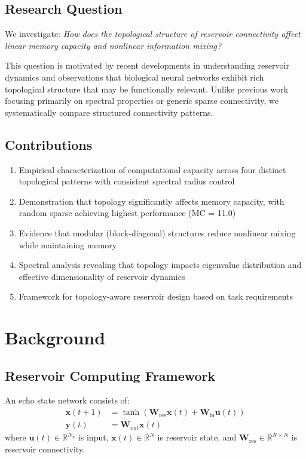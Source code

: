 \documentclass[11pt]{article}
\begin{document}
\subsection{Research Question}

We investigate: \textit{How does the topological structure of reservoir connectivity affect linear memory capacity and nonlinear information mixing?} 

This question is motivated by recent developments in understanding reservoir dynamics \citep{hart2024quantum} and observations that biological neural networks exhibit rich topological structure that may be functionally relevant. Unlike previous work focusing primarily on spectral properties or generic sparse connectivity, we systematically compare structured connectivity patterns.

\subsection{Contributions}

\begin{enumerate}
\item Empirical characterization of computational capacity across four distinct topological patterns with consistent spectral radius control
\item Demonstration that topology significantly affects memory capacity, with random sparse achieving highest performance (MC = 11.0)
\item Evidence that modular (block-diagonal) structures reduce nonlinear mixing while maintaining memory
\item Spectral analysis revealing that topology impacts eigenvalue distribution and effective dimensionality of reservoir dynamics
\item Framework for topology-aware reservoir design based on task requirements
\end{enumerate}

\section{Background}

\subsection{Reservoir Computing Framework}

An echo state network consists of:
\begin{align}
\mathbf{x}(t+1) &= \tanh(\mathbf{W}_{\text{res}}\mathbf{x}(t) + \mathbf{W}_{\text{in}}\mathbf{u}(t)) \\
\mathbf{y}(t) &= \mathbf{W}_{\text{out}}\mathbf{x}(t)
\end{align}
where $\mathbf{u}(t) \in \mathbb{R}^{N_u}$ is input, $\mathbf{x}(t) \in \mathbb{R}^N$ is reservoir state, and $\mathbf{W}_{\text{res}} \in \mathbb{R}^{N \times N}$ is reservoir connectivity.
\end{document}
